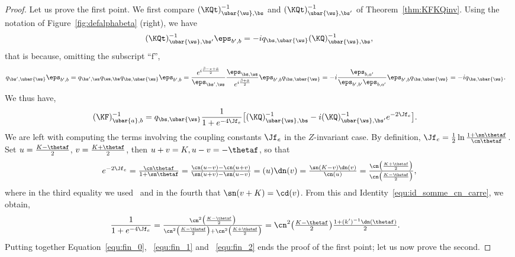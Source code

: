 \documentclass[a4paper,twoside,11pt]{article}
\begin{document}


\begin{proof}
Let us prove the first point. We first compare $(\KQt)^{-1}_{\ubar{\ws},\bs}$ and $(\KQt)^{-1}_{\ubar{\ws},\bs'}$ of Theorem~\ref{thm:KFKQinv}.
Using the notation of Figure~\ref{fig:defalphabeta} (right), we have
\[
(\KQt)^{-1}_{\ubar{\ws},\bs'}\eps_{b',b}=-iq_{\bs,\ubar{\ws}}(\KQ)^{-1}_{\ubar{\ws},\bs},
\]
that is because, omitting the subscript ``$\mathrm{f}$'', 
\begin{align*}
q_{\bs',\ubar{\ws}}\eps_{b',b}&=q_{\bs',\ws}q_{\ws,\bs} q_{\bs,\ubar{\ws}}\eps_{b',b}
=\frac{e^{i\frac{\bar{\beta}-\pi+\bar{\alpha}}{2}}}{\eps_{\bs',\ws}}
\frac{\eps_{\bs,\ws}}{e^{i\frac{\bar{\beta}+\bar{\alpha}}{2}}}\eps_{b',b}q_{\bs,\ubar{\ws}}
=-i\frac{\eps_{b,a'}}{\eps_{b',b'}\eps_{b,a'}}\eps_{b',b}q_{\bs,\ubar{\ws}}
=-iq_{\bs,\ubar{\ws}}.
\end{align*}
We thus have,
\begin{align}\label{equ:fin_0}
(\KF)^{-1}_{\ubar{a},b}&=q_{\bs,\ubar{\ws}}\frac{1}{1+e^{-4\Jf_e}}
\bigl[(\KQ)^{-1}_{\ubar{\ws},\bs} -i (\KQ)^{-1}_{\ubar{\ws},\bs'}e^{-2\Jf_e}\bigr].
\end{align}
We are left with computing the terms involving the coupling constants $\Jf_e$ in the $Z$-invariant case.
By definition, $\Jf_e=\frac{1}{2}\ln\frac{1+\sn\thetaf}{\cn\thetaf}$.
Set $u=\frac{K-\thetaf}{2}$, $v=\frac{K+\thetaf}{2}$, then $u+v=K,u-v=-\thetaf$, so that
\begin{equation}\label{equ:fin_1}
\textstyle 
e^{-2\Jf_e}=\frac{\cn\thetaf}{1+\sn\thetaf}=\frac{\cn(u-v)-\cn(u+v)}{\sn(u+v)-\sn(u-v)}=\sc(u)\dn(v)=
\frac{\sn(K-v)\dn(v)}{\cn(u)}=\frac{\cn\bigl(\frac{K+\thetaf}{2}\bigr)}{\cn\bigl(\frac{K-\thetaf}{2}\bigr)},
\end{equation}
where in the third equality we used~\cite[chap.2, ex.14 (iii)]{Lawden} and in the fourth that $\sn(v+K)=\cd(v)$.
From this and Identity~\eqref{equ:id_somme_cn_carre}, we obtain,
\begin{align}\label{equ:fin_2}
&\frac{1}{1+e^{-4\Jf_e}}=\textstyle
\frac{\cn^2\bigl(\frac{K-\thetaf}{2}\bigr)}{\cn^2\bigl(\frac{K-\thetaf}{2}\bigr)+\cn^2\bigl(\frac{K+\thetaf}{2}\bigr)}
=\cn^2\bigl(\frac{K-\thetaf}{2}\bigr)\frac{1+(k')^{-1}\dn(\thetaf)}{2}.
\end{align}
Putting together Equation~\eqref{equ:fin_0}, ~\eqref{equ:fin_1} and ~\eqref{equ:fin_2} ends the proof of the first point; let us now prove the second.


\end{proof}
\end{document}

